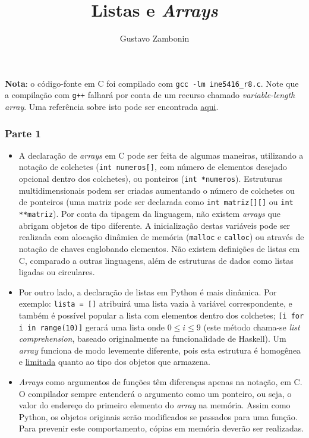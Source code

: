 \documentclass{../sftex/sftex}
\title{Listas e \emph{Arrays}}
\author{Gustavo Zambonin}
\begin{document}
\maketitle

\textbf{Nota}: o código-fonte em C foi compilado com
\verb!gcc -lm ine5416_r8.c!. Note que a compilação com \verb!g++! falhará
por conta de um recurso chamado \emph{variable-length array}. Uma referência
sobre isto pode ser encontrada \href{http://stackoverflow.com/a/25552114}{aqui}.

\subsubsection*{Parte 1}
\begin{itemize}
    \item A declaração de \emph{arrays} em C pode ser feita de algumas
    maneiras, utilizando a notação de colchetes (\verb!int numeros[]!, com
    número de elementos desejado opcional dentro dos colchetes), ou ponteiros
    (\verb!int *numeros!). Estruturas multidimensionais podem ser criadas
    aumentando o número de colchetes ou de ponteiros (uma matriz pode ser
    declarada como \verb!int matriz[][]! ou \verb!int **matriz!). Por conta
    da tipagem da linguagem, não existem \emph{arrays} que abrigam objetos
    de tipo diferente. A inicialização destas variáveis pode ser realizada
    com alocação dinâmica de memória (\verb!malloc! e \verb!calloc!) ou
    através de notação de chaves englobando elementos. Não existem definições
    de listas em C, comparado a outras linguagens, além de estruturas de dados
    como listas ligadas ou circulares.

    \item Por outro lado, a declaração de listas em Python é mais dinâmica.
    Por exemplo: \verb!lista = []! atribuirá uma lista vazia à variável
    correspondente, e também é possível popular a lista com elementos dentro
    dos colchetes; \verb![i for i in range(10)]! gerará uma lista onde
    $0 \leq i \leq 9$ (este método chama-se \emph{list comprehension},
    baseado originalmente na funcionalidade de Haskell). Um \emph{array}
    funciona de modo levemente diferente, pois esta estrutura é homogênea
    e \href{https://docs.python.org/2/library/array.html}{limitada} quanto ao
    tipo dos objetos que armazena.

    \item \emph{Arrays} como argumentos de funções têm diferenças apenas
    na notação, em C. O compilador sempre entenderá o argumento como um
    ponteiro, ou seja, o valor do endereço do primeiro elemento do
    \emph{array} na memória. Assim como Python, os objetos originais serão
    modificados se passados para uma função. Para prevenir este comportamento,
    cópias em memória deverão ser realizadas.
\end{itemize}
\end{document}
